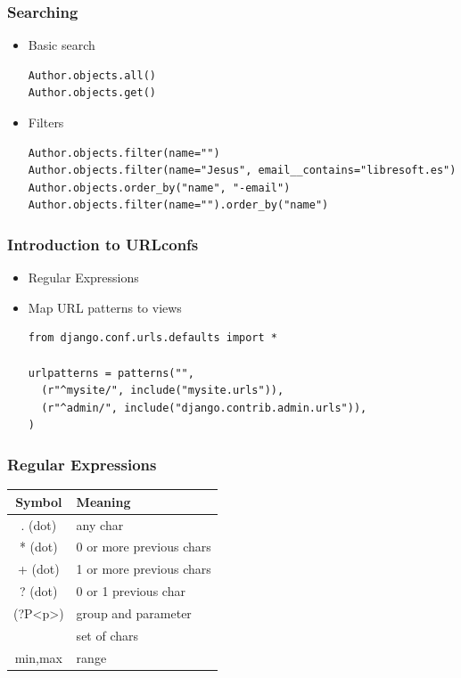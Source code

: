 \begin{frame}[fragile]
\frametitle{Searching}
\begin{itemize}
\item Basic search
{\scriptsize
\begin{verbatim}
Author.objects.all()
Author.objects.get()
\end{verbatim}
}
\item Filters
{\scriptsize
\begin{verbatim}
Author.objects.filter(name="")
Author.objects.filter(name="Jesus", email__contains="libresoft.es")
Author.objects.order_by("name", "-email")
Author.objects.filter(name="").order_by("name")
\end{verbatim}
}
\end{itemize}
\end{frame}




\begin{frame}[fragile]
\frametitle{Introduction to URLconfs}
\begin{itemize}
\item Regular Expressions
\item Map URL patterns to views
{\scriptsize
\begin{verbatim}
from django.conf.urls.defaults import *

urlpatterns = patterns("",
  (r"^mysite/", include("mysite.urls")),
  (r"^admin/", include("django.contrib.admin.urls")),
)
\end{verbatim}
}
\end{itemize}
\end{frame}


\begin{frame}
\frametitle{Regular Expressions}
\begin{table}
\begin{small}
\centering
\begin{tabular}{|c|l|}
\hline
\textbf{Symbol} & \textbf{Meaning} \\
\hline
 . (dot) & any char \\
\hline
 * (dot) & 0 or more previous chars \\
\hline
 + (dot) & 1 or more previous chars \\
\hline
 ? (dot) & 0 or 1 previous char \\
\hline
 (?P<p>) & group and parameter \\
\hline
 [] & set of chars \\
\hline
{min,max} & range \\
\hline
\end{tabular}
\end{small}
\end{table}
\end{frame}


